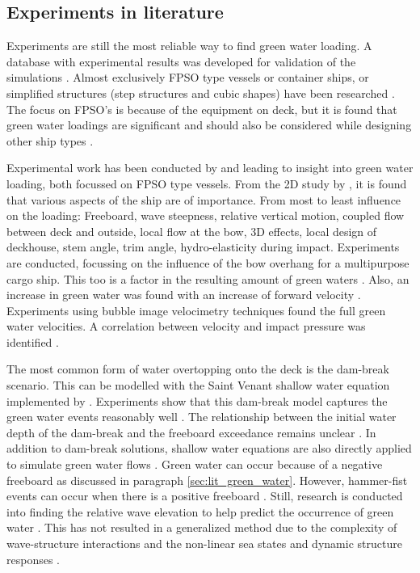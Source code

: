 \subsection{Experiments in literature}
\label{sec:lit_exp_green_water} 
Experiments are still the most reliable way to find green water loading. A database with experimental results was developed for validation of the simulations \cite{Lee2012}.  Almost exclusively FPSO type vessels or container ships, or simplified structures (step structures and cubic shapes) have been researched \cite{Chuang2019}. The focus on FPSO's is because of the equipment on deck, but it is found that green water loadings are significant and should also be considered while designing other ship types \cite{Kudupudi2019}. \par 
Experimental work has been conducted by \citet{Buchner2002} and \citet{Greco2001} leading to insight into green water loading, both focussed on FPSO type vessels. From the 2D study by \citet{Greco2001}, it is found that various aspects of the ship are of importance. From most to least influence on the loading: Freeboard, wave steepness, relative vertical motion, coupled flow between deck and outside, local flow at the bow, 3D effects, local design of deckhouse, stem angle, trim angle, hydro-elasticity during impact.  Experiments are conducted, focussing on the influence of the bow overhang for a multipurpose cargo ship. This too is a factor in the resulting amount of green waters \cite{Benmansour2016}. Also, an increase in green water was found with an increase of forward velocity \cite{Greco2012}. Experiments using bubble image velocimetry techniques found the full green water velocities. A correlation between velocity and impact pressure was identified \cite{Song2015}. \par  
The most common form of water overtopping onto the deck is the dam-break scenario. This can be modelled with the Saint Venant shallow water equation implemented by \citet{Ritter1892}. Experiments show that this dam-break model captures the green water events reasonably well \cite{Ryu2007, Chuang2018}. The relationship between the initial water depth of the dam-break and the freeboard exceedance remains unclear \cite{Chuang2019}. In addition to dam-break solutions, shallow water equations are also directly applied to simulate green water flows \cite{Greco2012, Liut2013}. Green water can occur because of a negative freeboard as discussed in paragraph \ref{sec:lit_green_water}. However, hammer-fist events can occur when there is a positive freeboard \cite{Greco2001}. Still, research is conducted into finding the relative wave elevation to help predict the occurrence of green water \cite{Buchner1995, Soares2005, Mori2003, Cox2001}. This has not resulted in a generalized method due to the complexity of wave-structure interactions and the non-linear sea states and dynamic structure responses \cite{Chuang2019}.


